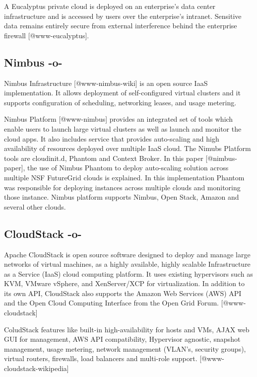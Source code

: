 A Eucalyptus private cloud is deployed on an enterprise's data center
infrastructure and is accessed by users over the enterprise's
intranet. Sensitive data remains entirely secure from external
interference behind the enterprise firewall [@www-eucalyptus].

     
\subsection{Nimbus -o-}

Nimbus Infrastructure [@www-nimbus-wiki] is an open source IaaS
implementation. It allows deployment of self-configured virtual
clusters and it supports configuration of scheduling, networking
leases, and usage metering.

Nimbus Platform [@www-nimbus] provides an integrated set of tools
which enable users to launch large virtual clusters as well as launch
and monitor the cloud apps. It also includes service that provides
auto-scaling and high availability of resources deployed over multiple
IaaS cloud.  The Nimubs Platform tools are cloudinit.d, Phantom and
Context Broker.  In this paper [@nimbus-paper], the use of Nimbus
Phantom to deploy auto-scaling solution across multiple NSF FutureGrid
clouds is explained. In this implementation Phantom was responsible
for deploying instances across multiple clouds and monitoring those
instance.  Nimbus platform supports Nimbus, Open Stack, Amazon and
several other clouds.

\subsection{CloudStack -o-}

Apache CloudStack is open source software designed to deploy and
manage large networks of virtual machines, as a highly available,
highly scalable Infrastructure as a Service (IaaS) cloud computing
platform. It uses existing hypervisors such as KVM, VMware vSphere,
and XenServer/XCP for virtualization. In addition to its own API,
CloudStack also supports the Amazon Web Services (AWS) API and the
Open Cloud Computing Interface from the Open Grid
Forum. [@www-cloudstack]

ColudStack features like built-in high-availability for hosts and VMs,
AJAX web GUI for management, AWS API compatibility, Hypervisor
agnostic, snapshot management, usage metering, network management
(VLAN's, security groups), virtual routers, firewalls, load balancers
and multi-role support. [@www-cloudstack-wikipedia]
    
